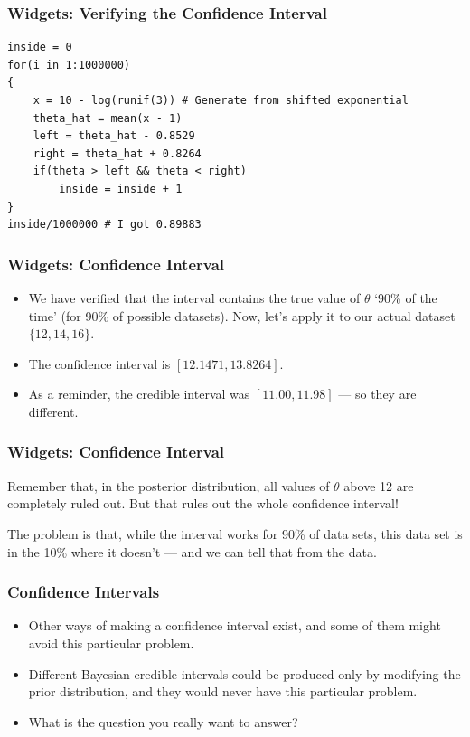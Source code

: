 \documentclass{beamer}
\begin{document}
\begin{frame}[fragile]
\frametitle{Widgets: Verifying the Confidence Interval}
\begin{verbatim}
inside = 0
for(i in 1:1000000)
{
    x = 10 - log(runif(3)) # Generate from shifted exponential
    theta_hat = mean(x - 1)
    left = theta_hat - 0.8529
    right = theta_hat + 0.8264
    if(theta > left && theta < right)
        inside = inside + 1
}
inside/1000000 # I got 0.89883
\end{verbatim}
\end{frame}


\begin{frame}
\frametitle{Widgets: Confidence Interval}
\begin{itemize}
\item We have verified that the interval contains the true value of $\theta$
`90\% of the time' (for 90\% of possible datasets). Now, let's apply it to our
actual dataset $\{12, 14, 16\}$. \pause
\item The confidence interval is $[12.1471, 13.8264]$. \pause
\item As a reminder, the credible interval was $[11.00, 11.98]$ --- so they are
different.
\end{itemize}

\end{frame}

\begin{frame}
\frametitle{Widgets: Confidence Interval}
Remember that, in the posterior distribution, all values of $\theta$
above 12 are completely ruled out. But that rules out the whole confidence
interval!

\pause

The problem is that, while the interval works for 90\% of data sets,
this data set is in the 10\% where it doesn't --- and we can tell that from the
data.
\end{frame}


\begin{frame}
\frametitle{Confidence Intervals}
\begin{itemize}
\item Other ways of making a confidence interval exist, and some of them might avoid
this particular problem.\pause
\item Different Bayesian credible intervals could be produced only by modifying the
prior distribution, and they would never have this particular problem.\pause
\item What is the question you really want to answer?
\end{itemize}

\end{frame}
\end{document}
